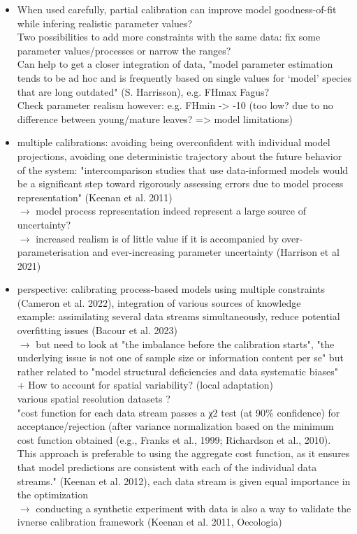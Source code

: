 \documentclass[letterpaper,8pt]{extarticle}  %
\begin{document}
\begin{doublespacing}
\begin{linenumbers}
\begin{itemize}
\item When used carefully, partial calibration can improve model goodness-of-fit while infering realistic parameter values? \\
Two possibilities to add more constraints with the same data: fix some parameter values/processes or narrow the ranges? \\
Can help to get a closer integration of data, "model parameter estimation tends to be ad hoc and is frequently based on single values for ‘model’ species that are long outdated" (S. Harrisson), e.g. FHmax Fagus?\\
Check parameter realism however: e.g. FHmin -> -10 (too low? due to no difference between young/mature leaves? => model limitations)

\item multiple calibrations: avoiding being overconfident with individual model projections, avoiding one deterministic trajectory about the future behavior of the system: "intercomparison studies that use data-informed models would be a significant step toward rigorously assessing errors due to model process representation" (Keenan et al. 2011) \\
$\rightarrow$ model process representation indeed represent a large source of uncertainty?\\
$\rightarrow$ increased realism is of little value if it is accompanied by over-parameterisation and ever-increasing parameter uncertainty (Harrison et al 2021) \\


\item perspective: calibrating process-based models using multiple constraints (Cameron et al. 2022), integration of various sources of knowledge \\
example: assimilating several data streams simultaneously, reduce potential overfitting issues (Bacour et al. 2023)\\
 $\rightarrow$ but need to look at "the imbalance before the calibration starts", "the underlying issue is not one of sample size or information content per se" but rather related to "model structural deficiencies and data systematic biases"\\
 + How to  account for spatial variability? (local adaptation)\\
 various spatial resolution datasets ? \\
 "cost function for each data stream passes a χ2 test (at 90\% confidence) for acceptance/rejection (after variance normalization based on the minimum cost function obtained (e.g., Franks et al., 1999; Richardson et al., 2010). This approach is preferable to using the aggregate cost function, as it ensures that model predictions are consistent with each of the individual data streams." (Keenan et al. 2012), each data stream is given equal importance in the optimization \\
 $\rightarrow$ conducting a synthetic experiment with data is also a way to validate the ivnerse calibration framework (Keenan et al. 2011, Oecologia)


\end{itemize}
\end{linenumbers}
\end{doublespacing}
\end{document}
